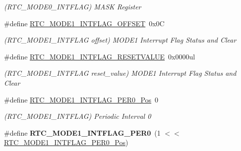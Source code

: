 \begin{DoxyCompactItemize}
\begin{DoxyCompactList}\small\item\em (R\+T\+C\+\_\+\+M\+O\+D\+E0\+\_\+\+I\+N\+T\+F\+L\+A\+G) M\+A\+S\+K Register \end{DoxyCompactList}\item 
\hypertarget{group___s_a_m_l21___r_t_c_ga74a368b55ee68c214cf40f90dff92475}{}\#define \hyperlink{group___s_a_m_l21___r_t_c_ga74a368b55ee68c214cf40f90dff92475}{R\+T\+C\+\_\+\+M\+O\+D\+E1\+\_\+\+I\+N\+T\+F\+L\+A\+G\+\_\+\+O\+F\+F\+S\+E\+T}~0x0\+C\label{group___s_a_m_l21___r_t_c_ga74a368b55ee68c214cf40f90dff92475}

\begin{DoxyCompactList}\small\item\em (R\+T\+C\+\_\+\+M\+O\+D\+E1\+\_\+\+I\+N\+T\+F\+L\+A\+G offset) M\+O\+D\+E1 Interrupt Flag Status and Clear \end{DoxyCompactList}\item 
\hypertarget{group___s_a_m_l21___r_t_c_gace87597087129c37284f1a25b4a594b1}{}\#define \hyperlink{group___s_a_m_l21___r_t_c_gace87597087129c37284f1a25b4a594b1}{R\+T\+C\+\_\+\+M\+O\+D\+E1\+\_\+\+I\+N\+T\+F\+L\+A\+G\+\_\+\+R\+E\+S\+E\+T\+V\+A\+L\+U\+E}~0x0000ul\label{group___s_a_m_l21___r_t_c_gace87597087129c37284f1a25b4a594b1}

\begin{DoxyCompactList}\small\item\em (R\+T\+C\+\_\+\+M\+O\+D\+E1\+\_\+\+I\+N\+T\+F\+L\+A\+G reset\+\_\+value) M\+O\+D\+E1 Interrupt Flag Status and Clear \end{DoxyCompactList}\item 
\hypertarget{group___s_a_m_l21___r_t_c_ga042229f6e6e4be07270bbbd9e589255a}{}\#define \hyperlink{group___s_a_m_l21___r_t_c_ga042229f6e6e4be07270bbbd9e589255a}{R\+T\+C\+\_\+\+M\+O\+D\+E1\+\_\+\+I\+N\+T\+F\+L\+A\+G\+\_\+\+P\+E\+R0\+\_\+\+Pos}~0\label{group___s_a_m_l21___r_t_c_ga042229f6e6e4be07270bbbd9e589255a}

\begin{DoxyCompactList}\small\item\em (R\+T\+C\+\_\+\+M\+O\+D\+E1\+\_\+\+I\+N\+T\+F\+L\+A\+G) Periodic Interval 0 \end{DoxyCompactList}\item 
\hypertarget{group___s_a_m_l21___r_t_c_ga7c976b6c3970c96b0f5ce445cf3c6265}{}\#define {\bfseries R\+T\+C\+\_\+\+M\+O\+D\+E1\+\_\+\+I\+N\+T\+F\+L\+A\+G\+\_\+\+P\+E\+R0}~(1 $<$$<$ \hyperlink{group___s_a_m_l21___r_t_c_ga042229f6e6e4be07270bbbd9e589255a}{R\+T\+C\+\_\+\+M\+O\+D\+E1\+\_\+\+I\+N\+T\+F\+L\+A\+G\+\_\+\+P\+E\+R0\+\_\+\+Pos})\label{group___s_a_m_l21___r_t_c_ga7c976b6c3970c96b0f5ce445cf3c6265}


\end{DoxyCompactItemize}
